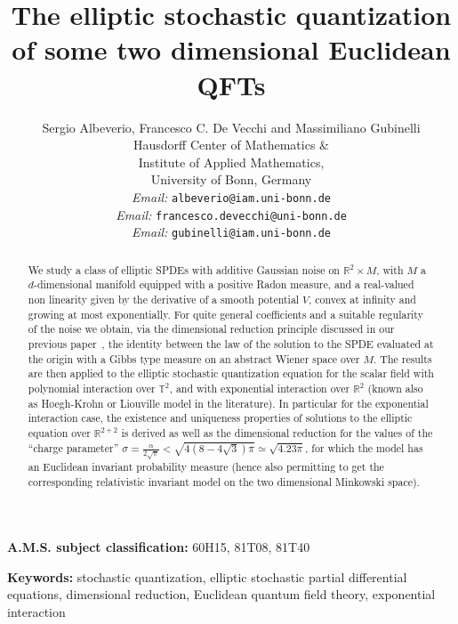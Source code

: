 \documentclass[a4paper,10pt]{article}
\newcommand{\tmaffiliation}[1]{\\ #1}
\newcommand{\tmemail}[1]{\\ \textit{Email:} \texttt{#1}}
\newcommand{\tmsep}{, }
\newcommand{\tmkeywords}{\textbf{Keywords:} }
\newcommand{\tmmsc}{\textbf{A.M.S. subject classification:} }
\begin{document}
\title{
  The elliptic stochastic quantization\\
  of some two dimensional Euclidean QFTs
}

\author{
  Sergio Albeverio, Francesco C. De Vecchi and Massimiliano Gubinelli
  \tmaffiliation{Hausdorff Center of Mathematics \&\\
  Institute of Applied Mathematics, \\
  University of Bonn, Germany}
  \tmemail{albeverio@iam.uni-bonn.de}
  \tmemail{francesco.devecchi@uni-bonn.de}
  \tmemail{gubinelli@iam.uni-bonn.de}
}

\maketitle

\begin{abstract}
  We study a class of elliptic SPDEs with additive Gaussian noise on
  $\mathbb{R}^2 \times M$, with $M$ a $d$-dimensional manifold equipped with a
  positive Radon measure, and a real-valued non linearity given by the
  derivative of a smooth potential $V$, convex at infinity and growing at most
  exponentially. For quite general coefficients and a suitable regularity of
  the noise we obtain, via the dimensional reduction principle discussed in
  our previous paper~{\cite{Albeverio2018elliptic}}, the identity between the
  law of the solution to the SPDE evaluated at the origin with a Gibbs type
  measure on an abstract Wiener space over $M$. The results are then applied
  to the elliptic stochastic quantization equation for the scalar field with
  polynomial interaction over $\mathbb{T}^2$, and with exponential interaction
  over $\mathbb{R}^2$ (known also as H{\o}egh-Krohn or Liouville model in the
  literature). In particular for the exponential interaction case, the
  existence and uniqueness properties of solutions to the elliptic equation
  over $\mathbb{R}^{2 + 2}$ is derived as well as the dimensional reduction
  for the values of the ``charge parameter'' $\sigma = \frac{\alpha}{2
  \sqrt{\pi}} < \sqrt{4 \left( 8 - 4 \sqrt{3} \right) \pi} \simeq \sqrt{4.23
  \pi}$, for which the model has an Euclidean invariant probability measure
  (hence also permitting to get the corresponding relativistic invariant model
  on the two dimensional Minkowski space).
\end{abstract}

\tmmsc{60H15}{\tmsep}{81T08}{\tmsep}{81T40}

\tmkeywords{stochastic quantization}{\tmsep}{elliptic stochastic partial
differential equations}{\tmsep}{dimensional reduction}{\tmsep}{Euclidean
quantum field theory}{\tmsep}{exponential interaction}
\end{document}
